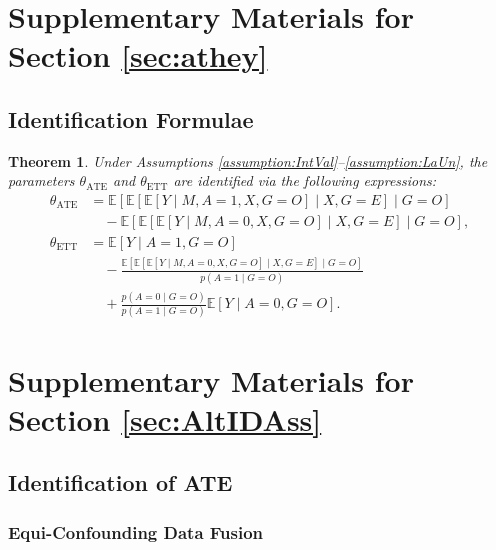\documentclass[10pt]{article}
\newtheorem{theorem}{Theorem}
\newcommand{\E}{\mathbb{E}}
\begin{document}
\appendix
\startcontents[appendix] %

\newpage
\section{Supplementary Materials for Section \ref{sec:athey}}
\label{sec:athey::supp}

\subsection{Identification Formulae}

\begin{theorem}
\label{thm:athey::supp}
Under Assumptions \ref{assumption:IntVal}--\ref{assumption:LaUn}, the parameters $\theta_{\text{ATE}}$ and $\theta_{\text{ETT}}$ are identified via the following expressions:
\begin{align*}
\theta_{\text{ATE}} &= \E\left[ \E\left[ \E[Y \mid M, A=1, X, G=O] \mid X, G=E \right] \mid G=O \right] \\
&\quad - \E\left[ \E\left[ \E[Y \mid M, A=0, X, G=O] \mid X, G=E \right] \mid G=O \right], \\
\theta_{\text{ETT}} &= \E[Y \mid A=1, G=O] \\
&\quad - \frac{\E\left[ \E\left[ \E[Y \mid M, A=0, X, G=O] \mid X, G=E \right] \mid G=O \right]}{p(A=1 \mid G=O)} \\
&\quad + \frac{p(A=0 \mid G=O)}{p(A=1 \mid G=O)} \E[Y \mid A=0, G=O].
\end{align*} 
\end{theorem}

\section{Supplementary Materials for Section \ref{sec:AltIDAss}}
\label{sec:AltIDAss::supp}


\subsection{Identification of ATE}
\label{sec:EqConf:ATE::supp}

\subsubsection{Equi-Confounding Data Fusion}
\end{document}
